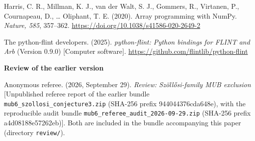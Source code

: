 \documentclass[
  11pt,
]{article}
\begin{document}
Harris, C. R., Millman, K. J., van der Walt, S. J., Gommers, R.,
Virtanen, P., Cournapeau, D., \ldots{} Oliphant, T. E. (2020). Array
programming with NumPy. \emph{Nature, 585}, 357--362.
\url{https://doi.org/10.1038/s41586-020-2649-2}

The python-flint developers. (2025). \emph{python-flint: Python bindings
for FLINT and Arb} (Version 0.9.0) {[}Computer software{]}.
\url{https://github.com/flintlib/python-flint}

\textbf{Review of the earlier version}

Anonymous referee. (2026, September 29). \emph{Review: Szöllősi-family
MUB exclusion} {[}Unpublished referee report of the earlier bundle
\texttt{mub6\_szollosi\_conjecture3.zip} (SHA-256 prefix
944044376cda648e), with the reproducible audit bundle
\texttt{mub6\_referee\_audit\_2026-09-29.zip} (SHA-256 prefix
a4d08188e57262eb){]}. Both are included in the bundle accompanying this
paper (directory \texttt{review/}).
\end{document}
